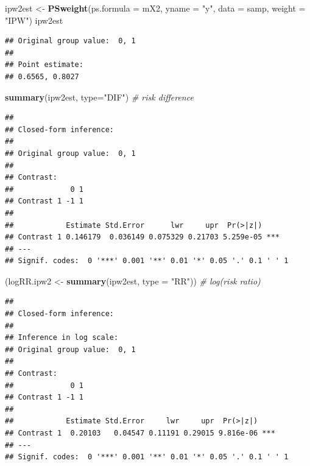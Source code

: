 \documentclass[
]{book}
\newenvironment{Shaded}{\begin{snugshade}}{\end{snugshade}}
\newcommand{\AttributeTok}[1]{\textcolor[rgb]{0.13,0.29,0.53}{#1}}
\newcommand{\CommentTok}[1]{\textcolor[rgb]{0.56,0.35,0.01}{\textit{#1}}}
\newcommand{\FunctionTok}[1]{\textcolor[rgb]{0.13,0.29,0.53}{\textbf{#1}}}
\newcommand{\NormalTok}[1]{#1}
\newcommand{\OtherTok}[1]{\textcolor[rgb]{0.56,0.35,0.01}{#1}}
\newcommand{\StringTok}[1]{\textcolor[rgb]{0.31,0.60,0.02}{#1}}
\theoremstyle{definition}
\theoremstyle{definition}
\theoremstyle{definition}
\theoremstyle{definition}
\theoremstyle{remark}
\begin{document}
\begin{Shaded}
\begin{Highlighting}[]
\NormalTok{ipw2est }\OtherTok{\textless{}{-}} \FunctionTok{PSweight}\NormalTok{(}\AttributeTok{ps.formula =}\NormalTok{ mX2, }\AttributeTok{yname =} \StringTok{"y"}\NormalTok{, }\AttributeTok{data =}\NormalTok{ samp, }
                    \AttributeTok{weight =} \StringTok{"IPW"}\NormalTok{)}
\NormalTok{ipw2est}
\end{Highlighting}
\end{Shaded}

\begin{verbatim}
## Original group value:  0, 1 
## 
## Point estimate: 
## 0.6565, 0.8027
\end{verbatim}

\begin{Shaded}
\begin{Highlighting}[]
\FunctionTok{summary}\NormalTok{(ipw2est, }\AttributeTok{type=}\StringTok{"DIF"}\NormalTok{)  }\CommentTok{\# risk difference}
\end{Highlighting}
\end{Shaded}

\begin{verbatim}
## 
## Closed-form inference: 
## 
## Original group value:  0, 1 
## 
## Contrast: 
##             0 1
## Contrast 1 -1 1
## 
##            Estimate Std.Error      lwr     upr  Pr(>|z|)    
## Contrast 1 0.146179  0.036149 0.075329 0.21703 5.259e-05 ***
## ---
## Signif. codes:  0 '***' 0.001 '**' 0.01 '*' 0.05 '.' 0.1 ' ' 1
\end{verbatim}

\begin{Shaded}
\begin{Highlighting}[]
\NormalTok{(logRR.ipw2 }\OtherTok{\textless{}{-}} \FunctionTok{summary}\NormalTok{(ipw2est, }\AttributeTok{type =} \StringTok{"RR"}\NormalTok{))  }\CommentTok{\# log(risk ratio)}
\end{Highlighting}
\end{Shaded}

\begin{verbatim}
## 
## Closed-form inference: 
## 
## Inference in log scale: 
## Original group value:  0, 1 
## 
## Contrast: 
##             0 1
## Contrast 1 -1 1
## 
##            Estimate Std.Error     lwr     upr  Pr(>|z|)    
## Contrast 1  0.20103   0.04547 0.11191 0.29015 9.816e-06 ***
## ---
## Signif. codes:  0 '***' 0.001 '**' 0.01 '*' 0.05 '.' 0.1 ' ' 1
\end{verbatim}
\end{document}
